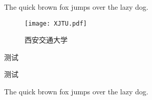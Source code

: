 % 
%
%
% 
%


        The quick brown fox jumps over the lazy dog.

        \begin{figure}[h!]
          \centering
          \texttt{[image: XJTU.pdf]}
          \caption{西安交通大学}
          \label{fig:in-appendix}
        \end{figure}


            测试


                测试



        The quick brown fox jumps over the lazy dog.
